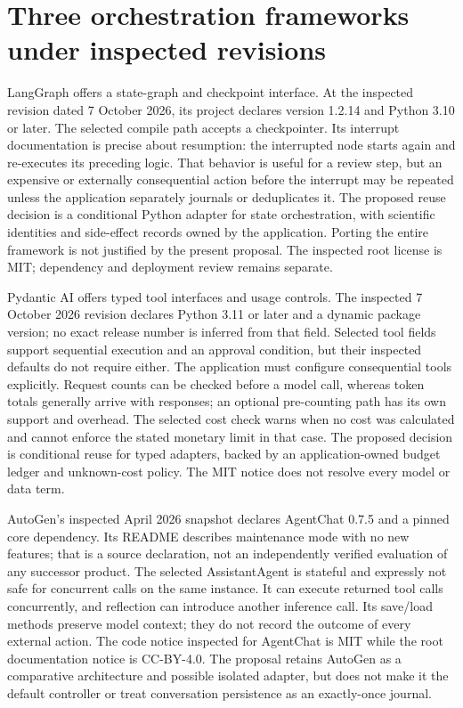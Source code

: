 \section{Three orchestration frameworks under inspected revisions}

LangGraph offers a state-graph and checkpoint interface. At the inspected
revision dated 7 October 2026, its project declares version 1.2.14 and Python
3.10 or later. The selected compile path accepts a checkpointer. Its interrupt
documentation is precise about resumption: the interrupted node starts again
and re-executes its preceding logic. That behavior is useful for a review
step, but an expensive or externally consequential action before the
interrupt may be repeated unless the application separately journals or
deduplicates it. The proposed reuse decision is a conditional Python
adapter for state orchestration, with scientific identities and side-effect
records owned by the application. Porting the entire framework is not
justified by the present proposal. The inspected root license is MIT;
dependency and deployment review remains separate. \citep{v12_la04_langgraph}

Pydantic AI offers typed tool interfaces and usage controls. The inspected
7 October 2026 revision declares Python 3.11 or later and a dynamic package
version; no exact release number is inferred from that field. Selected tool
fields support sequential execution and an approval condition, but their
inspected defaults do not require either. The application must configure
consequential tools explicitly. Request counts can be checked before a model
call, whereas token totals generally arrive with responses; an optional
pre-counting path has its own support and overhead. The selected cost check
warns when no cost was calculated and cannot enforce the stated monetary
limit in that case. The proposed decision is conditional reuse for typed
adapters, backed by an application-owned budget ledger and unknown-cost
policy. The MIT notice does not resolve every model or data term.
\citep{v12_la04_pydantic_ai}

AutoGen's inspected April 2026 snapshot declares AgentChat 0.7.5 and a pinned
core dependency. Its README describes maintenance mode with no new features;
that is a source declaration, not an independently verified evaluation of
any successor product. The selected AssistantAgent is stateful and expressly
not safe for concurrent calls on the same instance. It can execute returned
tool calls concurrently, and reflection can introduce another inference
call. Its save/load methods preserve model context; they do not record the
outcome of every external action. The code notice inspected for AgentChat
is MIT while the root documentation notice is CC-BY-4.0. The proposal retains
AutoGen as a comparative architecture and possible isolated adapter, but
does not make it the default controller or treat conversation persistence
as an exactly-once journal. \citep{v12_la04_autogen}


